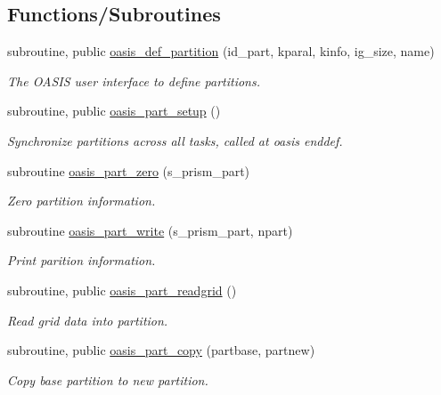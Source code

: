 \subsection*{Functions/\+Subroutines}
\begin{DoxyCompactItemize}
\item 
subroutine, public \hyperlink{namespacemod__oasis__part_af070605328f2b705735d7fbf8b838ff4}{oasis\+\_\+def\+\_\+partition} (id\+\_\+part, kparal, kinfo, ig\+\_\+size, name)
\begin{DoxyCompactList}\small\item\em The O\+A\+S\+IS user interface to define partitions. \end{DoxyCompactList}\item 
subroutine, public \hyperlink{namespacemod__oasis__part_a80f66cc0ce5857aa53d070861f05b521}{oasis\+\_\+part\+\_\+setup} ()
\begin{DoxyCompactList}\small\item\em Synchronize partitions across all tasks, called at oasis enddef. \end{DoxyCompactList}\item 
subroutine \hyperlink{namespacemod__oasis__part_a17c747bc29d25b558df42524bd63ac90}{oasis\+\_\+part\+\_\+zero} (s\+\_\+prism\+\_\+part)
\begin{DoxyCompactList}\small\item\em Zero partition information. \end{DoxyCompactList}\item 
subroutine \hyperlink{namespacemod__oasis__part_a12edb4b0248a3f562fe5f6e16eede06a}{oasis\+\_\+part\+\_\+write} (s\+\_\+prism\+\_\+part, npart)
\begin{DoxyCompactList}\small\item\em Print parition information. \end{DoxyCompactList}\item 
subroutine, public \hyperlink{namespacemod__oasis__part_ae5c72886d4078ff0cc8e4c87a4dfd43c}{oasis\+\_\+part\+\_\+readgrid} ()
\begin{DoxyCompactList}\small\item\em Read grid data into partition. \end{DoxyCompactList}\item 
subroutine, public \hyperlink{namespacemod__oasis__part_aabbc667e6db4ed0a0d593749a396f392}{oasis\+\_\+part\+\_\+copy} (partbase, partnew)
\begin{DoxyCompactList}\small\item\em Copy base partition to new partition. \end{DoxyCompactList}\item 

\end{DoxyCompactItemize}
